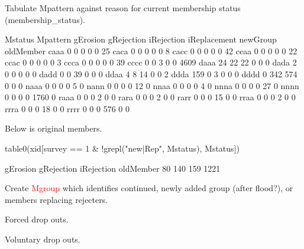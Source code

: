 Tabulate \textsf{Mpattern} against reason for current membership status (\textsf{membership\_status}).
\begin{Schunk}
\begin{Soutput}
        Mstatus
Mpattern gErosion gRejection iRejection iReplacement newGroup oldMember
    caaa        0          0          0            0        0        25
    caca        0          0          0            0        0         8
    cacc        0          0          0            0        0        42
    ccaa        0          0          0            0        0        22
    ccac        0          0          0            0        0         3
    ccca        0          0          0            0        0        39
    cccc        0          0          3            0        0      4609
    daaa       24         22         22            0        0         0
    dada        2          0          0            0        0         0
    dadd        0          0         39            0        0         0
    ddaa        4          8         14            0        0         2
    ddda      159          0          3            0        0         0
    dddd        0        342        574            0        0         0
    naaa        0          0          0            0        5         0
    nann        0          0          0            0       12         0
    nnaa        0          0          0            0        4         0
    nnna        0          0          0            0       27         0
    nnnn        0          0          0            0     1760         0
    raaa        0          0          0            2        0         0
    rara        0          0          0            2        0         0
    rarr        0          0          0           15        0         0
    rraa        0          0          0            2        0         0
    rrra        0          0          0           18        0         0
    rrrr        0          0          0          576        0         0
\end{Soutput}
\end{Schunk}
Below is original members.
\begin{Schunk}
\begin{Sinput}
table0(xid[survey == 1 & !grepl("new|Rep", Mstatus), Mstatus])
\end{Sinput}
\begin{Soutput}

  gErosion gRejection iRejection  oldMember 
        80        140        159       1221 
\end{Soutput}
\end{Schunk}
Create \textcolor{red}{\textsf{Mgroup}} which identifies continued, newly added group (after flood?), or members replacing rejecters. 
\begin{description}
\vspace{1.0ex}\setlength{\itemsep}{1.0ex}\setlength{\baselineskip}{12pt}
\item[gErosion] Forced drop outs.
\item[gRejection, iRejection] Voluntary drop outs.
\end{description}
\gobblepars

